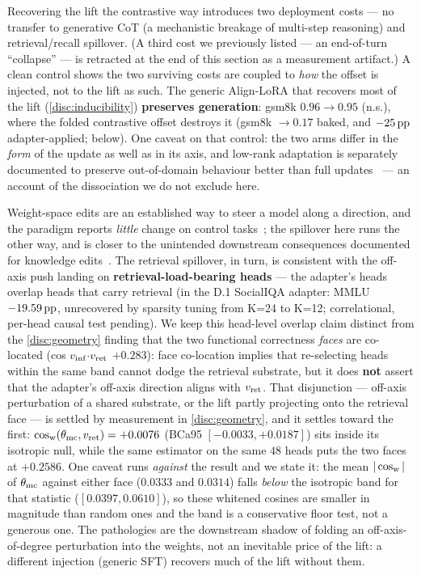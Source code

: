 Recovering the lift the contrastive way introduces two deployment costs --- no
transfer to generative CoT (a mechanistic breakage of multi-step reasoning) and
retrieval/recall spillover. (A third cost we previously listed --- an end-of-turn
``collapse'' --- is retracted at the end of this section as a measurement
artifact.) A clean control shows the two surviving costs are coupled to \emph{how}
the offset is injected, not to the lift as such. The generic Align-LoRA that
recovers most of the lift (\cref{disc:inducibility}) \textbf{preserves generation}:
gsm8k $0.96{\rightarrow}0.95$ (n.s.), where the folded contrastive offset destroys
it (gsm8k ${\rightarrow}0.17$ baked, and $-25\,\mathrm{pp}$ adapter-applied; below). One caveat
on that control: the two arms differ in the \emph{form} of the update as well as in
its axis, and low-rank adaptation is separately documented to preserve out-of-domain
behaviour better than full updates~\citep{LoRAForgetsLess} --- an account of the
dissociation we do not exclude here.

Weight-space edits are an established way to steer a model along a direction, and the
paradigm reports \emph{little} change on control tasks~\citep{TaskArithmetic}; the spillover
here runs the other way, and is closer to the unintended downstream consequences
documented for knowledge edits~\citep{RippleEffects}.
The retrieval spillover, in turn, is consistent with the off-axis push landing on
\textbf{retrieval-load-bearing heads} --- the adapter's heads overlap heads that
carry retrieval (in the D.1 SocialIQA adapter: MMLU $-19.59\,\mathrm{pp}$, unrecovered by
sparsity tuning from K=24 to K=12; correlational, per-head causal test pending). We
keep this head-level overlap claim distinct from the \cref{disc:geometry} finding
that the two functional correctness \emph{faces} are co-located (cos
$v_{\mathrm{inf}}{\cdot}v_{\mathrm{ret}}$ $+0.283$): face co-location implies that re-selecting heads
within the same band cannot dodge the retrieval substrate, but it does \textbf{not}
assert that the adapter's off-axis direction aligns with $v_{\mathrm{ret}}$. That disjunction
--- off-axis perturbation of a shared substrate, or the lift partly projecting onto
the retrieval face --- is settled by measurement in \cref{disc:geometry}, and it
settles toward the first: $\cos_{\mathrm{w}}(\theta_{\mathrm{mc}},v_{\mathrm{ret}}) = +0.0076$ (BCa95
$[-0.0033, +0.0187]$) sits inside its isotropic null, while the same estimator on the
same $48$ heads puts the two faces at $+0.2586$. One caveat runs \emph{against} the
result and we state it: the mean $|\cos_{\mathrm{w}}|$ of $\theta_{\mathrm{mc}}$ against either face
($0.0333$ and $0.0314$) falls \emph{below} the isotropic band for that statistic
($[0.0397, 0.0610]$), so these whitened cosines are smaller in magnitude than random
ones and the band is a conservative floor test, not a generous one. The pathologies
are the downstream
shadow of folding an off-axis-of-degree perturbation into the weights, not an
inevitable price of the lift: a different injection (generic SFT) recovers much of
the lift without them.

